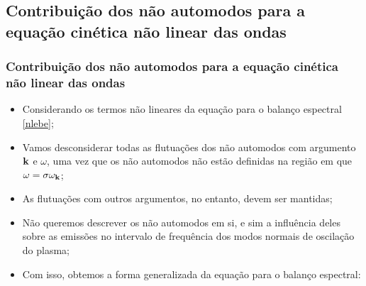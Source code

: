 \documentclass[10pt,aspectratio=1610,lualatex]{beamer}
\begin{document}
\subsection{Contribuição dos não automodos para a equação cinética  não linear das ondas}
\begin{frame}
  \frametitle{Contribuição dos não automodos para a equação cinética
    não linear das ondas}
  \begin{itemize}
    \item Considerando os termos não lineares da equação para o balanço
    espectral \eqref{nlebe};
    \vspace{0.4cm}
    \pause
    \item Vamos desconsiderar todas as flutuações dos não automodos
    com argumento ${\bf k}$ e $\omega$, uma vez que os não automodos
    não estão definidas na região em que $\omega=\sigma \omega_{\bf k}$;
    \vspace{0.4cm}
    \pause
    \item As flutuações com outros argumentos, no entanto, devem ser
    mantidas;
    \vspace{0.4cm}
    \pause
    \item Não queremos descrever os não automodos em si, e
    sim a influência deles sobre as emissões no intervalo de
    frequência dos modos normais de oscilação do plasma;
    \vspace{0.4cm}
    \pause
    \item Com isso, obtemos a forma generalizada da equação para o
    balanço espectral:    
  \end{itemize}
\end{frame}
\end{document}
